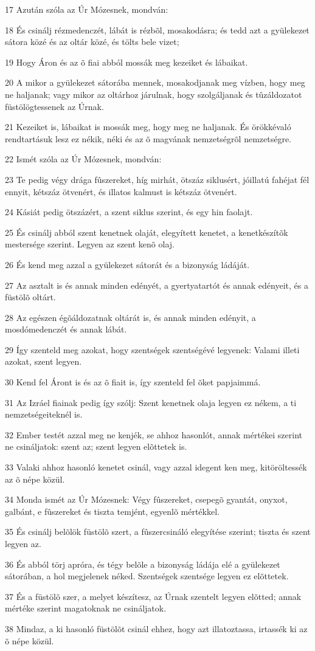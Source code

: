 \par 17 Azután szóla az Úr Mózesnek, mondván:
\par 18 És csinálj rézmedenczét, lábát is rézbõl, mosakodásra; és tedd azt a gyülekezet sátora közé és az oltár közé, és tölts bele vizet;
\par 19 Hogy Áron és az õ fiai abból mossák meg kezeiket és lábaikat.
\par 20 A mikor a gyülekezet sátorába mennek, mosakodjanak meg vízben, hogy meg ne haljanak; vagy mikor az oltárhoz járulnak, hogy szolgáljanak és tûzáldozatot füstölögtessenek az Úrnak.
\par 21 Kezeiket is, lábaikat is mossák meg, hogy meg ne haljanak. És örökkévaló rendtartásuk lesz ez nékik, néki és az õ magvának nemzetségrõl nemzetségre.
\par 22 Ismét szóla az Úr Mózesnek, mondván:
\par 23 Te pedig végy drága fûszereket, híg mirhát, ötszáz siklusért, jóillatú fahéjat fél ennyit, kétszáz ötvenért, és illatos kalmust is kétszáz ötvenért.
\par 24 Kásiát pedig ötszázért, a szent siklus szerint, és egy hin faolajt.
\par 25 És csinálj abból szent kenetnek olaját, elegyített kenetet, a kenetkészítõk mestersége szerint. Legyen az szent kenõ olaj.
\par 26 És kend meg azzal a gyülekezet sátorát és a bizonyság ládáját.
\par 27 Az asztalt is és annak minden edényét, a gyertyatartót és annak edényeit, és a füstölõ oltárt.
\par 28 Az egészen égõáldozatnak oltárát is, és annak minden edényit, a mosdómedenczét és annak lábát.
\par 29 Így szenteld meg azokat, hogy szentségek szentségévé legyenek: Valami illeti azokat, szent legyen.
\par 30 Kend fel Áront is és az õ fiait is, így szenteld fel õket papjaimmá.
\par 31 Az Izráel fiainak pedig így szólj: Szent kenetnek olaja legyen ez nékem, a ti nemzetségeiteknél is.
\par 32 Ember testét azzal meg ne kenjék, se ahhoz hasonlót, annak mértékei szerint ne csináljatok: szent az; szent legyen elõttetek is.
\par 33 Valaki ahhoz hasonló kenetet csinál, vagy azzal idegent ken meg, kitöröltessék az õ népe közül.
\par 34 Monda ismét az Úr Mózesnek: Végy fûszereket, csepegõ gyantát, onyxot, galbánt, e fûszereket és tiszta temjént, egyenlõ mértékkel.
\par 35 És csinálj belõlök füstölõ szert, a fûszercsináló elegyítése szerint; tiszta és szent legyen az.
\par 36 És abból törj apróra, és tégy belõle a bizonyság ládája elé a gyülekezet sátorában, a hol megjelenek néked. Szentségek szentsége legyen ez elõttetek.
\par 37 És a füstölõ szer, a melyet készítesz, az Úrnak szentelt legyen elõtted; annak mértéke szerint magatoknak ne csináljatok.
\par 38 Mindaz, a ki hasonló füstölõt csinál ehhez, hogy azt illatoztassa, irtassék ki az õ népe közül.

